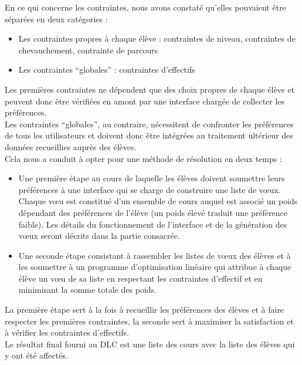 \documentclass[12pt]{article}
\begin{document}
En ce qui concerne les contraintes, nous avons constaté qu’elles pouvaient être séparées en deux catégories : \\
    
\begin{itemize}
  \item   Les contraintes propres à chaque élève : contraintes de niveau, contraintes de chevauchement, contrainte de parcours 
  \item   Les contraintes “globales” : contraintes d’effectifs 
\end{itemize}

Les premières contraintes ne dépendent que des choix propres de chaque élève et peuvent donc être vérifiées en amont par une interface chargée de collecter les préférences. \\

Les contraintes “globales”, au contraire, nécessitent de confronter les préférences de tous les utilisateurs et doivent donc être intégrées au traitement ultérieur des données recueillies auprès des élèves. \\

Cela nous a conduit à opter pour une méthode de résolution en deux temps :  \\

\begin{itemize}
  \item Une première étape au cours de laquelle les élèves doivent soumettre leurs préférences à une interface qui se charge de construire une liste de vœux. Chaque vœu est constitué d’un ensemble de cours auquel est associé un poids dépendant des préférences de l’élève (un poids élevé traduit une préférence faible). Les détails du fonctionnement de l’interface et de la génération des vœux seront décrits dans la partie consacrée. 
  \item Une seconde étape consistant à rassembler les listes de vœux des élèves et à les soumettre à un programme d’optimisation linéaire qui attribue à chaque élève un vœu de sa liste en respectant les contraintes d’effectif et en minimisant la somme totale des poids. 
\end{itemize}

La première étape sert à la fois à recueillir les préférences des élèves et à faire respecter les premières contraintes, la seconde sert à maximiser la satisfaction et à vérifier les contraintes d’effectifs. \\

Le résultat final fourni au DLC est une liste des cours avec la liste des élèves qui y ont été affectés. \\
\end{document}
